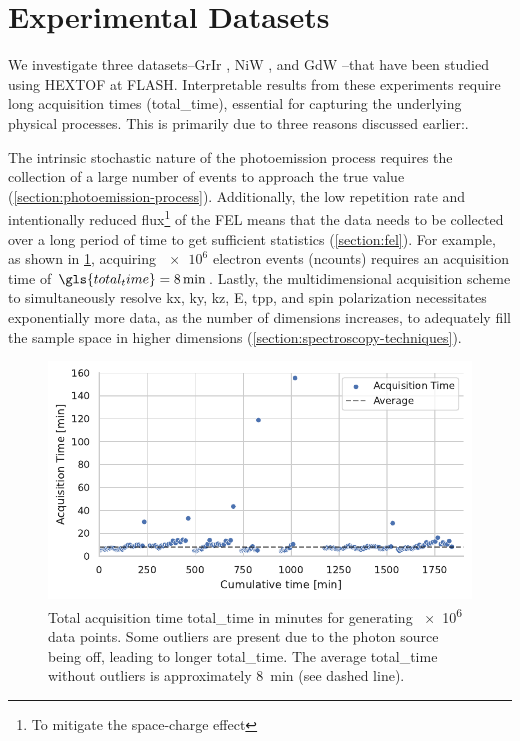 \section{Experimental Datasets}\label{section:datasets}
We investigate three datasets--\gls{GrIr} \cite{heberMultispectralTimeresolvedEnergy2022}, \gls{NiW} \cite{shokeenRealtimeObservationNonequilibrium2024}, and \gls{GdW} \cite{kutnyakhovMultidimensionalPhotoemissionSpectra2024}--that have been studied using \gls{HEXTOF} at \gls{FLASH}. Interpretable results from these experiments require long acquisition times (\gls{total_time}), essential for capturing the underlying physical processes. This is primarily due to three reasons discussed earlier:.

The intrinsic stochastic nature of the photoemission process requires the collection of a large number of events to approach the true value (\cref{section:photoemission-process}). Additionally, the low repetition rate and intentionally reduced flux\footnote{To mitigate the space-charge effect} of the \gls{FEL} means that the data  needs to be collected over a long period of time to get sufficient statistics (\cref{section:fel}). For example, as shown in \cref{fig:acq-time-1M}, acquiring $\num{e6}$ electron events (\gls{ncounts})  requires an acquisition time of $\gls{total_time}=\qty{8}{\min}$. Lastly, the multidimensional acquisition scheme to simultaneously resolve \gls{kx}, \gls{ky}, \gls{kz}, \gls{E}, \gls{tpp}, and spin polarization necessitates exponentially  more data, as the number of dimensions increases, to adequately fill the sample space in higher dimensions (\cref{section:spectroscopy-techniques}).

\begin{figure}[h]
    \centering
    \includegraphics[width=0.8\linewidth]{images/acq_time_1M.pdf}
    \caption{Total acquisition time \gls{total_time} in minutes for generating \num{e6} data points. Some outliers are present due to the photon source being off, leading to longer \gls{total_time}. The average \gls{total_time} without outliers is approximately \qty{8}{min} (see dashed line).}
    \label{fig:acq-time-1M}
\end{figure}

